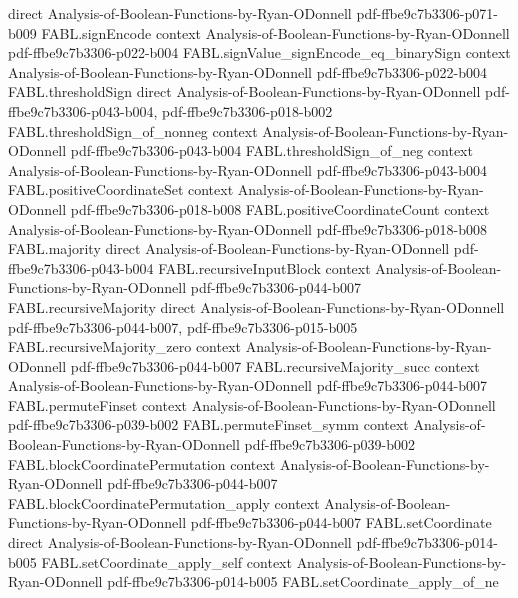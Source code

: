 \begin{theorem}
  {direct}
  {Analysis-of-Boolean-Functions-by-Ryan-ODonnell}
  {pdf-ffbe9c7b3306-p071-b009}
\proofstep
  {FABL.signEncode}
  {context}
  {Analysis-of-Boolean-Functions-by-Ryan-ODonnell}
  {pdf-ffbe9c7b3306-p022-b004}
\proofstep
  {FABL.signValue_signEncode_eq_binarySign}
  {context}
  {Analysis-of-Boolean-Functions-by-Ryan-ODonnell}
  {pdf-ffbe9c7b3306-p022-b004}
\proofstep
  {FABL.thresholdSign}
  {direct}
  {Analysis-of-Boolean-Functions-by-Ryan-ODonnell}
  {pdf-ffbe9c7b3306-p043-b004,
    pdf-ffbe9c7b3306-p018-b002}
\proofstep
  {FABL.thresholdSign_of_nonneg}
  {context}
  {Analysis-of-Boolean-Functions-by-Ryan-ODonnell}
  {pdf-ffbe9c7b3306-p043-b004}
\proofstep
  {FABL.thresholdSign_of_neg}
  {context}
  {Analysis-of-Boolean-Functions-by-Ryan-ODonnell}
  {pdf-ffbe9c7b3306-p043-b004}
\proofstep
  {FABL.positiveCoordinateSet}
  {context}
  {Analysis-of-Boolean-Functions-by-Ryan-ODonnell}
  {pdf-ffbe9c7b3306-p018-b008}
\proofstep
  {FABL.positiveCoordinateCount}
  {context}
  {Analysis-of-Boolean-Functions-by-Ryan-ODonnell}
  {pdf-ffbe9c7b3306-p018-b008}
\proofstep
  {FABL.majority}
  {direct}
  {Analysis-of-Boolean-Functions-by-Ryan-ODonnell}
  {pdf-ffbe9c7b3306-p043-b004}
\proofstep
  {FABL.recursiveInputBlock}
  {context}
  {Analysis-of-Boolean-Functions-by-Ryan-ODonnell}
  {pdf-ffbe9c7b3306-p044-b007}
\proofstep
  {FABL.recursiveMajority}
  {direct}
  {Analysis-of-Boolean-Functions-by-Ryan-ODonnell}
  {pdf-ffbe9c7b3306-p044-b007,
    pdf-ffbe9c7b3306-p015-b005}
\proofstep
  {FABL.recursiveMajority_zero}
  {context}
  {Analysis-of-Boolean-Functions-by-Ryan-ODonnell}
  {pdf-ffbe9c7b3306-p044-b007}
\proofstep
  {FABL.recursiveMajority_succ}
  {context}
  {Analysis-of-Boolean-Functions-by-Ryan-ODonnell}
  {pdf-ffbe9c7b3306-p044-b007}
\proofstep
  {FABL.permuteFinset}
  {context}
  {Analysis-of-Boolean-Functions-by-Ryan-ODonnell}
  {pdf-ffbe9c7b3306-p039-b002}
\proofstep
  {FABL.permuteFinset_symm}
  {context}
  {Analysis-of-Boolean-Functions-by-Ryan-ODonnell}
  {pdf-ffbe9c7b3306-p039-b002}
\proofstep
  {FABL.blockCoordinatePermutation}
  {context}
  {Analysis-of-Boolean-Functions-by-Ryan-ODonnell}
  {pdf-ffbe9c7b3306-p044-b007}
\proofstep
  {FABL.blockCoordinatePermutation_apply}
  {context}
  {Analysis-of-Boolean-Functions-by-Ryan-ODonnell}
  {pdf-ffbe9c7b3306-p044-b007}
\proofstep
  {FABL.setCoordinate}
  {direct}
  {Analysis-of-Boolean-Functions-by-Ryan-ODonnell}
  {pdf-ffbe9c7b3306-p014-b005}
\proofstep
  {FABL.setCoordinate_apply_self}
  {context}
  {Analysis-of-Boolean-Functions-by-Ryan-ODonnell}
  {pdf-ffbe9c7b3306-p014-b005}
\proofstep
  {FABL.setCoordinate_apply_of_ne}

\end{theorem}
